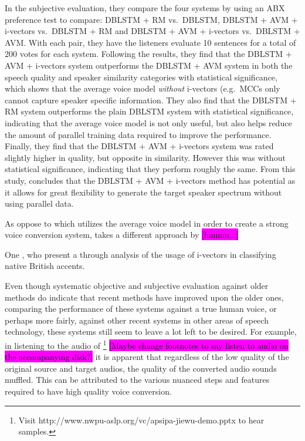 \documentclass
[
    a4paper,
    twoside,
    12pt,
]
{report}
\begin{document}
In the subjective evaluation, they compare the four systems by using an
ABX preference test to compare: DBLSTM + RM vs.~DBLSTM, DBLSTM + AVM +
i-vectors vs.~DBLSTM + RM and DBLSTM + AVM + i-vectors vs.~DBLSTM + AVM.
With each pair, they have the listeners evaluate 10 sentences for a
total of 200 votes for each system. Following the results, they find
that the DBLSTM + AVM + i-vectors system outperforms the DBLSTM + AVM
system in both the speech quality and speaker similarity categories with
statistical significance, which shows that the average voice model
\emph{without} i-vectors (e.g.~MCCs only cannot capture speaker specific
information. They also find that the DBLSTM + RM system outperforms the
plain DBLSTM system with statistical significance, indicating that the
average voice model is not only useful, but also helps reduce the amount
of parallel training data required to improve the performance. Finally,
they find that the DBLSTM + AVM + i-vectors system was rated slightly
higher in quality, but opposite in similarity. However this was without
statistical significance, indicating that they perform roughly the same.
From this study, \textcite{wu2016} concludes that the DBLSTM + AVM +
i-vectors method has potential as it allows for great flexibility to
generate the target speaker spectrum without using parallel data.

As oppose to \textcite{wu2016} which utilizes the average voice model in
order to create a strong voice conversion system,
\textcite{kinnunen2017} takes a different approach by
\colorbox{magenta}{[hmmm...]}

One \textcite{demarco2013}, who present a through analysis of the usage
of i-vectors in classifying native British accents.

Even though systematic objective and subjective evaluation against older
methods do indicate that recent methods have improved upon the older
ones, comparing the performance of these systems against a true human
voice, or perhaps more fairly, against other recent systems in other
areas of speech technology, these systems still seem to leave a lot left
to be desired. For example, in listening to the audio of
\textcite{wu2016}\footnote{Visit http://www.nwpu-aslp.org/vc/apsipa-jiewu-demo.pptx to hear samples.}
\colorbox{magenta}{[Maybe change footnotes to say listen to audio on the accompanying disk?]}
it is apparent that regardless of the low quality of the original source
and target audios, the quality of the converted audio sounds muffled.
This can be attributed to the various nuanced steps and features
required to have high quality voice conversion.
\end{document}
